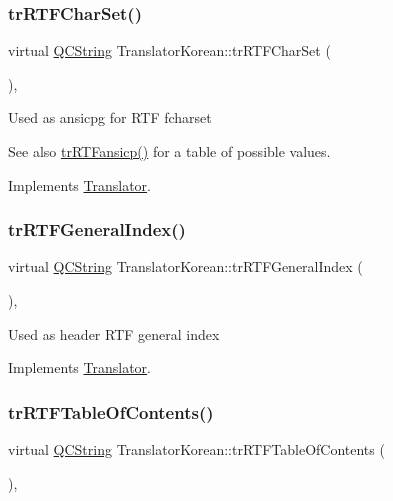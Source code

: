 \subsubsection{\texorpdfstring{trRTFCharSet()}{trRTFCharSet()}}
{\footnotesize\ttfamily virtual \mbox{\hyperlink{class_q_c_string}{Q\+C\+String}} Translator\+Korean\+::tr\+R\+T\+F\+Char\+Set (\begin{DoxyParamCaption}{ }\end{DoxyParamCaption})\hspace{0.3cm}{\ttfamily [inline]}, {\ttfamily [virtual]}}

Used as ansicpg for R\+TF fcharset \begin{DoxySeeAlso}{See also}
\mbox{\hyperlink{class_translator_korean_a9f814151d64327b59b1819e756329d9f}{tr\+R\+T\+Fansicp()}} for a table of possible values. 
\end{DoxySeeAlso}


Implements \mbox{\hyperlink{class_translator_afad391f3cbfb5ce6332b7239f8e2049a}{Translator}}.

\mbox{\label{class_translator_korean_a65b285ca91229329881bde2ac0febcd2}} 
\subsubsection{\texorpdfstring{trRTFGeneralIndex()}{trRTFGeneralIndex()}}
{\footnotesize\ttfamily virtual \mbox{\hyperlink{class_q_c_string}{Q\+C\+String}} Translator\+Korean\+::tr\+R\+T\+F\+General\+Index (\begin{DoxyParamCaption}{ }\end{DoxyParamCaption})\hspace{0.3cm}{\ttfamily [inline]}, {\ttfamily [virtual]}}

Used as header R\+TF general index 

Implements \mbox{\hyperlink{class_translator}{Translator}}.

\mbox{\label{class_translator_korean_a283fcda4bac83cc8d6726cc68d50e524}} 
\subsubsection{\texorpdfstring{trRTFTableOfContents()}{trRTFTableOfContents()}}
{\footnotesize\ttfamily virtual \mbox{\hyperlink{class_q_c_string}{Q\+C\+String}} Translator\+Korean\+::tr\+R\+T\+F\+Table\+Of\+Contents (\begin{DoxyParamCaption}{ }\end{DoxyParamCaption})\hspace{0.3cm}{\ttfamily [inline]}, {\ttfamily [virtual]}}


